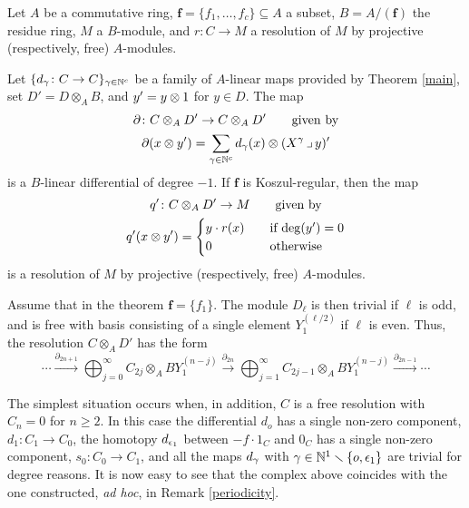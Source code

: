 \begin{theorem}
\label{resolution}
Let $A$ be a commutative ring, ${\boldsymbol f}=\{f_1,\dots,f_c\}
\subseteq A$ a subset, $B=A/({\boldsymbol f})$ the residue ring,
$M$ a $B$-module, and $r \colon  C \to M$ a resolution of
$M$ by projective (respectively, free) $A$-modules.

Let $\{d_\gamma\colon C\to C\}_{\gamma\in{\mathbb N}^c}$ be a family of $A$-linear maps
provided by Theorem \ref{main}, set $D'=D\otimes_AB$, and $y'=y\otimes 1$
for $y\in D$.  The map
\begin{equation}
\begin{gathered}
\label{partial}
\partial \colon C\otimes_A D' \to C\otimes_A D'
\qquad\text{given by}\\
\partial(x\otimes y') = \sum_{\gamma \in{\mathbb N}^c} d_\gamma(x) \otimes (X^{\gamma} \operatorname{\lrcorner} y)'
\end{gathered}
\end{equation}
is a $B$-linear differential of degree $-1$.  If ${\boldsymbol f}$ is
Koszul-regular, then the map 
\begin{gather*}
    q'\colon C \otimes_A D' \to M \qquad \text{given by}\\
    q'(x\otimes y')= \begin{cases}
                    y \cdot r(x) &\quad\text{if $\deg(y')=0$}\\
                    0            &\quad\text{otherwise}
                \end{cases}
\end{gather*}
is a resolution of $M$ by projective (respectively, free) $A$-modules.
 \end{theorem}

\begin{Remark}
\label{hypersurface}
Assume that in the theorem ${\boldsymbol f}=\{f_1\}$.  The module
$D_\ell$ is then trivial if $\ell$ is odd, and is free with basis
consisting of a single element $Y_1^{(\ell/2)}$ if $\ell$ is even.
Thus, the resolution $C\otimes_AD'$ has the form
\[
\cdots\xrightarrow{\partial_{2n+1}}
\bigoplus_{j=0}^\infty C_{2j}\otimes_A BY_1^{(n-j)}
\xrightarrow{\partial_{2n}}
\bigoplus_{j=1}^\infty C_{2j-1}\otimes_A BY_1^{(n-j)}
\xrightarrow{\partial_{2n-1}}
\cdots
\]

The simplest situation occurs when, in addition, $C$ is a free
resolution with $C_n=0$ for $n\ge 2$.  In this case the differential
$d_o$ has a single non-zero component, $d_1\colon C_1\to C_0$, the
homotopy $d_{\epsilon_1}$ between $-f\cdot 1_C$ and $0_C$ has a single
non-zero component, $s_0\colon C_0\to C_1$, and all the maps $d_\gamma$
with $\gamma\in{\mathbb N}^1\smallsetminus\{o,\epsilon_1\}$ are trivial for degree
reasons.  It is now easy to see that the complex above coincides with
the one constructed, {\sl ad hoc\/}, in Remark \ref{periodicity}.
 \end{Remark}

